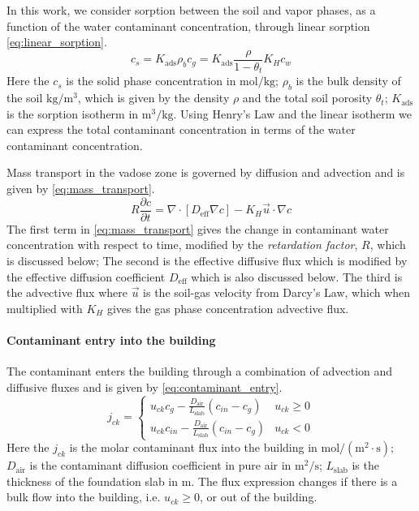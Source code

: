In this work, we consider sorption between the soil and vapor phases, as a function of the water contaminant concentration, through linear sorption \eqref{eq:linear_sorption}.
\begin{equation}\label{eq:linear_sorption}
  c_s = K_\mathrm{ads} \rho_b c_g = K_\mathrm{ads} \frac{\rho}{1-\theta_t} K_H c_w
\end{equation}
Here the $c_s$ is the solid phase concentration in $\mathrm{mol/kg}$;
$\rho_b$ is the bulk density of the soil $\mathrm{kg/m^3}$, which is given by the density $\rho$ and the total soil porosity $\theta_t$;
$K_\mathrm{ads}$ is the sorption isotherm in $\mathrm{m^3/kg}$.
Using Henry's Law and the linear isotherm we can express the total contaminant concentration in terms of the water contaminant concentration.\par

Mass transport in the vadose zone is governed by diffusion and advection and is given by \eqref{eq:mass_transport}.
\begin{equation}\label{eq:mass_transport}
  R \frac{\partial c}{\partial t} =
    \nabla \cdot[ D_\mathrm{eff} \nabla c] -
    K_H \vec{u} \cdot \nabla c
\end{equation}
The first term in \eqref{eq:mass_transport} gives the change in contaminant water concentration with respect to time, modified by the \textit{retardation factor}, $R$, which is discussed below;
The second is the effective diffusive flux which is modified by the effective diffusion coefficient $D_\mathrm{eff}$ which is also discussed below.
The third is the advective flux where $\vec{u}$ is the soil-gas velocity from Darcy's Law, which when multiplied with $K_H$ gives the gas phase concentration advective flux.\par

\paragraph{Contaminant entry into the building}

The contaminant enters the building through a combination of advection and diffusive fluxes and is given by \eqref{eq:contaminant_entry}.
\begin{equation}\label{eq:contaminant_entry}
  j_{ck} = \begin{cases}
    u_{ck} c_g - \frac{D_\mathrm{air}}{L_\mathrm{slab}} (c_{in} - c_g) & u_{ck} \geq 0 \\
    u_{ck} c_{in} - \frac{D_\mathrm{air}}{L_\mathrm{slab}} (c_{in} - c_g) & u_{ck} < 0
\end{cases}
\end{equation}
Here the $j_{ck}$ is the molar contaminant flux into the building in $\mathrm{mol/(m^2 \cdot s)}$;
$D_\mathrm{air}$ is the contaminant diffusion coefficient in pure air in $\mathrm{m^2/s}$;
$L_\mathrm{slab}$ is the thickness of the foundation slab in $\mathrm{m}$.
The flux expression changes if there is a bulk flow into the building, i.e. $u_{ck} \geq 0$, or out of the building.

